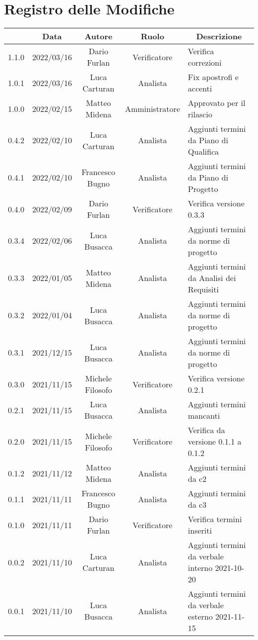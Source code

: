 \thispagestyle{empty}
\section*{Registro delle Modifiche}

\begin{center}
	\renewcommand{\arraystretch}{1.8}
	\begin{longtable}[c]{c | c | c | c | p{5cm}}
		\rowcolor[HTML]{125E28}
		\multicolumn{1}{c}{\color[HTML]{FFFFFF} \textbf{Versione}} & 
		\multicolumn{1}{c}{\color[HTML]{FFFFFF} \textbf{Data}} & 
		\multicolumn{1}{c}{\color[HTML]{FFFFFF} \textbf{Autore}} & 
		\multicolumn{1}{c}{\color[HTML]{FFFFFF} \textbf{Ruolo}} & 
		\multicolumn{1}{c}{\color[HTML]{FFFFFF} \textbf{Descrizione}} \\
		\endhead
		1.1.0 & 2022/03/16 & Dario Furlan & Verificatore & Verifica correzioni\\
		1.0.1 & 2022/03/16 & Luca Carturan & Analista & Fix apostrofi e accenti\\
		1.0.0 & 2022/02/15 & Matteo Midena & Amministratore & Approvato per il rilascio\\
		0.4.2 & 2022/02/10 & Luca Carturan & Analista & Aggiunti termini da Piano di Qualifica\\
		0.4.1 & 2022/02/10 & Francesco Bugno & Analista	& Aggiunti termini da Piano di Progetto\\
		0.4.0 & 2022/02/09 & Dario Furlan & Verificatore & Verifica versione 0.3.3\\
		0.3.4 & 2022/02/06 & Luca Busacca & Analista & Aggiunti termini da norme di progetto\\
		0.3.3 & 2022/01/05 & Matteo Midena & Analista & Aggiunti termini da Analisi dei Requisiti\\
		0.3.2 & 2022/01/04 & Luca Busacca & Analista & Aggiunti termini da norme di progetto\\
		0.3.1 & 2021/12/15 & Luca Busacca & Analista & Aggiunti termini da norme di progetto\\
		0.3.0 & 2021/11/15 & Michele Filosofo & Verificatore & Verifica versione 0.2.1\\
		0.2.1 & 2021/11/15 & Luca Busacca & Analista & Aggiunti termini mancanti\\
		0.2.0 & 2021/11/15 & Michele Filosofo & Verificatore & Verifica da versione 0.1.1 a 0.1.2\\
		0.1.2 & 2021/11/12 & Matteo Midena & Analista & Aggiunti termini da c2\\
		0.1.1 & 2021/11/11 & Francesco Bugno & Analista & Aggiunti termini da c3\\
		0.1.0 & 2021/11/11 & Dario Furlan & Verificatore & Verifica termini inseriti\\
		0.0.2 & 2021/11/10 & Luca Carturan & Analista & Aggiunti termini da verbale interno 2021-10-20\\
		0.0.1 & 2021/11/10 & Luca Busacca & Analista & Aggiunti termini da verbale esterno 2021-11-15\\

	\end{longtable}
\end{center}